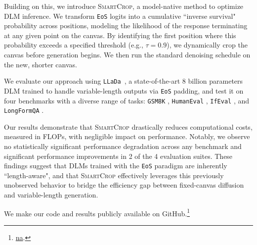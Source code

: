\documentclass{article}
\theoremstyle{plain}
\theoremstyle{definition}
\theoremstyle{remark}
\begin{document}
Building on this, we introduce \textsc{SmartCrop}, a model-native method to optimize DLM inference. We transform \verb|EoS| logits into a cumulative ``inverse survival" probability across positions, modeling the likelihood of the response terminating at any given point on the canvas. By identifying the first position where this probability exceeds a specified threshold (e.g., $\tau = 0.9$), we dynamically crop the canvas before generation begins. We then run the standard denoising schedule on the new, shorter canvas.

We evaluate our approach using \texttt{LLaDa}~\cite{nie2025large}, a state-of-the-art 8 billion parameters DLM trained to handle variable-length outputs via \verb|EoS| padding, and test it on four benchmarks with a diverse range of tasks: \texttt{GSM8K} \citep[reasoning,][]{cobbe2021trainingverifierssolvemath}, \texttt{HumanEval} \citep[code generation,][]{chen2021evaluatinglargelanguagemodels}, \texttt{IfEval} \citep[instruction following,][]{zhou2023instructionfollowingevaluationlargelanguage}, and \texttt{LongFormQA} \citep[question answering][]{koksal2023longform}. 

Our results demonstrate that \textsc{SmartCrop} drastically reduces computational costs, measured in FLOPs, with negligible impact on performance. Notably, we observe no statistically significant performance degradation across any benchmark and significant performance improvements in 2 of the 4 evaluation suites. These findings suggest that DLMs trained with the \verb|EoS| paradigm are inherently ``length-aware", and that \textsc{SmartCrop} effectively leverages this previously unobserved behavior to bridge the efficiency gap between fixed-canvas diffusion and variable-length generation.

We make our code and results publicly available on GitHub.\footnote{\url{na}.}

\end{document}
